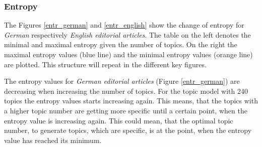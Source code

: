 \subsubsection{Entropy}

The Figures \ref{entr_german} and \ref{entr_english} show the change of entropy for \textit{German} respectively \textit{English editorial articles}. The table on the left denotes the minimal and maximal entropy given the number of topics. On the right the maximal entropy values (blue line) and the minimal entropy values (orange line) are plotted. This structure will repeat in the different key figures.

The entropy values for \textit{German editorial articles} (Figure \ref{entr_german}) are decreasing when increasing the number of topics. For the topic model with 240 topics the entropy values starts increasing again. This means, that the topics with a higher topic number are getting more specific until a certain point, when the entropy value is increasing again. This could mean, that the optimal topic number, to generate topics, which are specific, is at the point, when the entropy value has reached its minimum.

